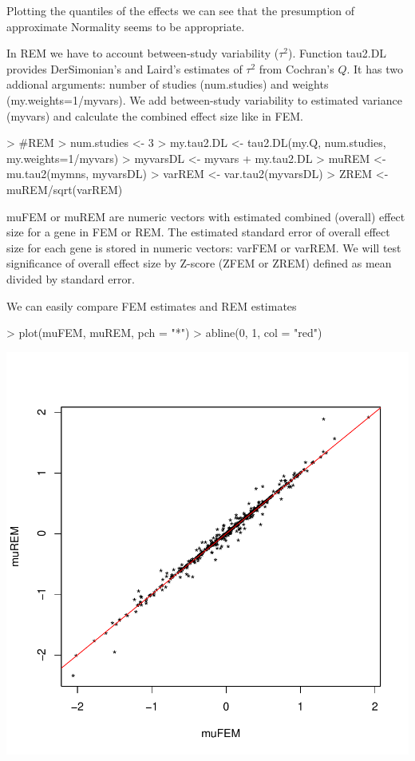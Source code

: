 \documentclass[a4paper]{report}
\begin{document}
Plotting the quantiles of the effects we can see that the presumption of approximate Normality seems to be appropriate.\par
In REM we have to account between-study variability ($\tau^2$). Function {\ttfamily tau2.DL} provides DerSimonian's and Laird's \cite{DerSimonian} estimates of $\tau^2$ from Cochran's $Q$. It has two addional arguments: number of studies ({\ttfamily num.studies}) and weights ({\ttfamily my.weights=1/myvars}). We add between-study variability to estimated variance ({\ttfamily myvars}) and calculate the combined effect size like in FEM.
\begin{Schunk}
\begin{Sinput}
> #REM
> num.studies <- 3
> my.tau2.DL <- tau2.DL(my.Q, num.studies, my.weights=1/myvars)
> myvarsDL <- myvars + my.tau2.DL
> muREM <- mu.tau2(mymns, myvarsDL)
> varREM <- var.tau2(myvarsDL)
> ZREM <- muREM/sqrt(varREM)
\end{Sinput}
\end{Schunk}
{\ttfamily muFEM} or {\ttfamily muREM} are numeric vectors with estimated combined (overall) effect size for a gene in FEM or REM. The estimated standard error of overall effect size for each gene is stored in numeric vectors: {\ttfamily varFEM} or {\ttfamily varREM}. We will test significance of overall effect size by Z-score ({\ttfamily ZFEM} or {\ttfamily ZREM}) defined as mean divided by standard error.\par
We can easily compare FEM estimates and REM estimates
\begin{center}
\begin{Schunk}
\begin{Sinput}
> plot(muFEM, muREM, pch = "*")
> abline(0, 1, col = "red")
\end{Sinput}
\end{Schunk}
\includegraphics{MAMA_full-018}
\end{center} 
\end{document}
